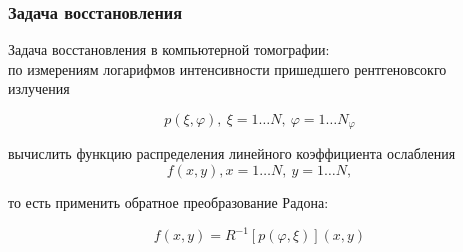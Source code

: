 \begin{frame}
\frametitle{Задача восстановления}

Задача восстановления в компьютерной томографии: \\

по измерениям логарифмов интенсивности пришедшего рентгеновсокго излучения

$$
p(\xi, \varphi),\ \xi = 1 \dots N,\ \varphi = 1 \dots N_\varphi
$$

вычислить функцию распределения линейного коэффициента ослабления 
$$
f(x,y), x = 1 \dots N,\ y = 1 \dots N, 
$$

то есть применить обратное преобразование Радона:

$$
f(x,y) = R^{-1}[p(\varphi, \xi)](x,y)
$$

\end{frame}
